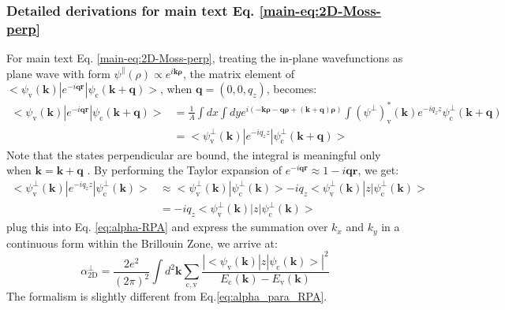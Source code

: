 \documentclass[manuscript=suppinfo,email=true,hyperref=true,keywords=false]{achemso}
\begin{document}
\subsubsection{Detailed derivations for main text Eq. \ref{main-eq:2D-Moss-perp}}
\label{ssec:theory-2}
For main text Eq. \ref{main-eq:2D-Moss-perp}, treating the in-plane
wavefunctions as plane wave with form
$\psi^{\parallel}(\rho) \propto e^{i \mathbf{k \rho}}$, the matrix
element of
$<\psi_{\mathrm{v}}(\mathbf{k})|e^{-i\mathbf{qr}}|\psi_{\mathrm{c}}(\mathbf{k+q})>$,
when $\mathbf{q}=(0, 0, q_{z})$, becomes\cite{Hybertsen_1987}:
\begin{equation}
  \begin{aligned}
    \label{eq:matrix-z}
  <\psi_{\mathrm{v}}(\mathbf{k})|e^{-i\mathbf{qr}}|\psi_{\mathrm{c}}(\mathbf{k+q})>
  &= \frac{1}{A} \int dx \int dy
  e^{i(\mathbf{-k \rho} - \mathbf{q \rho} + \mathbf{(k+q) \rho})}
  \int (\psi^{\perp})^{*}_{\mathrm{v}}(\mathbf{k})e^{-iq_{z}z}\psi^{\perp}_{\mathrm{c}}(\mathbf{k+q})\\
  &= <\psi^{\perp}_{\mathrm{v}}(\mathbf{k})|e^{-iq_{z}z}|\psi^{\perp}_{\mathrm{c}}(\mathbf{k+q})>
  \end{aligned}
\end{equation}
Note that the states perpendicular are bound, the integral is
meaningful only when $\mathbf{k=k+q}$ \cite{davies_physics_1997}. By
performing the Taylor expansion of
$e^{-i\mathbf{qr}} \approx 1 - i\mathbf{qr}$, we get:
\begin{equation}
  \begin{aligned}
    \label{eq:matrix-z-2}
    <\psi^{\perp}_{\mathrm{v}}(\mathbf{k})|e^{-iq_{z}z}|\psi^{\perp}_{\mathrm{c}}(\mathbf{k})>
    &\approx <\psi^{\perp}_{\mathrm{v}}(\mathbf{k})|\psi^{\perp}_{\mathrm{c}}(\mathbf{k})> -
    iq_{z} <\psi^{\perp}_{\mathrm{v}}(\mathbf{k})|z|\psi^{\perp}_{\mathrm{c}}(\mathbf{k})>\\
    &= -iq_{z} <\psi^{\perp}_{\mathrm{v}}(\mathbf{k})|z|\psi^{\perp}_{\mathrm{c}}(\mathbf{k})>
   \end{aligned}
\end{equation}
plug this into Eq. \ref{eq:alpha-RPA} and express the summation over
$k_{x}$ and $k_{y}$ in a continuous form within the Brillouin Zone, we
arrive at:
\begin{equation}
\label{eq:alpha_perp_RPA}
\alpha_{\mathrm{2D}}^{\perp} = \frac{2e^{2}}{(2 \pi) ^{2}} \int d^{2}\mathbf{k}
\sum_{\mathrm{c, v}}
\frac{|<\psi_{\mathrm{v}}(\mathbf{k})|z|\psi_{\mathrm{c}}(\mathbf{k})>|^{2}}
{E_{\mathrm{c}}(\mathbf{k}) - E_{\mathrm{v}}(\mathbf{k})}
\end{equation}
The formalism is slightly different from Eq.\ref{eq:alpha_para_RPA}.
\end{document}
